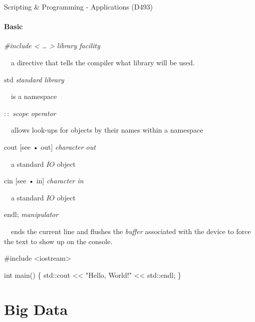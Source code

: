 \documentclass[
  letterpaper,
  DIV=11,
  numbers=noendperiod]{scrreprt}
\newenvironment{Shaded}{\begin{snugshade}}{\end{snugshade}}
\newcommand{\BuiltInTok}[1]{\textcolor[rgb]{0.00,0.23,0.31}{#1}}
\newcommand{\DataTypeTok}[1]{\textcolor[rgb]{0.68,0.00,0.00}{#1}}
\newcommand{\ImportTok}[1]{\textcolor[rgb]{0.00,0.46,0.62}{#1}}
\newcommand{\NormalTok}[1]{\textcolor[rgb]{0.00,0.23,0.31}{#1}}
\newcommand{\OperatorTok}[1]{\textcolor[rgb]{0.37,0.37,0.37}{#1}}
\newcommand{\PreprocessorTok}[1]{\textcolor[rgb]{0.68,0.00,0.00}{#1}}
\newcommand{\StringTok}[1]{\textcolor[rgb]{0.13,0.47,0.30}{#1}}
\begin{document}

Scripting \& Programming - Applications (D493)

\subsubsection*{Basic}\label{basic}

{\emph{\#include \textless{} \ldots{} \textgreater{}}} \emph{library
facility}\\
\strut ~~a directive that tells the compiler what library will be used.

\emph{\(\text{std}\)} \emph{standard library}\\
\strut ~~is a namespace

\emph{\(::\)} \emph{scope operator}\\
\strut ~~allows look-ups for objects by their names within a namespace

\emph{\(\text{cout}\)} {[}see • out{]} \emph{character out}\\
\strut ~~a standard \(IO\) object

\emph{\(\text{cin}\)} {[}see • in{]} \emph{character in}\\
\strut ~~a standard \(IO\) object

\emph{\(\text{endl;}\)} \emph{manipulator}\\
\strut ~~ends the current line and flushes the \emph{buffer} associated
with the device to force the text to show up on the console.

\begin{Shaded}
\begin{Highlighting}[]
\PreprocessorTok{\#include }\ImportTok{\textless{}iostream\textgreater{}}

\DataTypeTok{int}\NormalTok{ main}\OperatorTok{()}
\OperatorTok{\{}
  \BuiltInTok{std::}\NormalTok{cout }\OperatorTok{\textless{}\textless{}} \StringTok{"Hello, World!"} \OperatorTok{\textless{}\textless{}} \BuiltInTok{std::}\NormalTok{endl}\OperatorTok{;}
\OperatorTok{\}}
\end{Highlighting}
\end{Shaded}


\chapter*{Big Data}\label{big-data}
\end{document}
